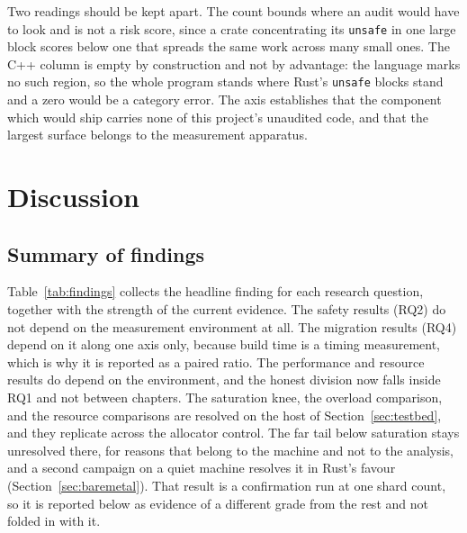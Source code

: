 \documentclass[english,oneside,a4paper,censored,csm,software-track-2020]{HYthesisML}
\begin{document}
Two readings should be kept apart. The count bounds where an audit would have to look and is not
a risk score, since a crate concentrating its \texttt{unsafe} in one large block scores below one
that spreads the same work across many small ones. The C++ column is empty by construction and
not by advantage: the language marks no such region, so the whole program stands where
Rust's \texttt{unsafe} blocks stand and a zero would be a category error. The axis
establishes that the component which would ship carries none of this project's unaudited code,
and that the largest surface belongs to the measurement apparatus.

\chapter{Discussion\label{chapter:discussion}}

\section{Summary of findings}
Table~\ref{tab:findings} collects the headline finding for each research question, together with the
strength of the current evidence. The safety results (RQ2) do not depend on the measurement
environment at all. The migration results (RQ4) depend on it along one axis only, because build
time is a timing measurement, which is why it is reported as a paired ratio. The performance and
resource results do depend on the environment, and the honest division now falls inside RQ1 and not
between chapters. The saturation knee, the overload comparison, and the
resource comparisons are resolved on the host of Section~\ref{sec:testbed}, and they replicate
across the allocator control. The far tail below saturation stays unresolved there, for reasons that
belong to the machine and not to the analysis, and a second campaign on a quiet machine resolves it
in Rust's favour (Section~\ref{sec:baremetal}). That result is a confirmation run at one shard
count, so it is reported below as evidence of a different grade from the rest and not folded in
with it.
\end{document}
